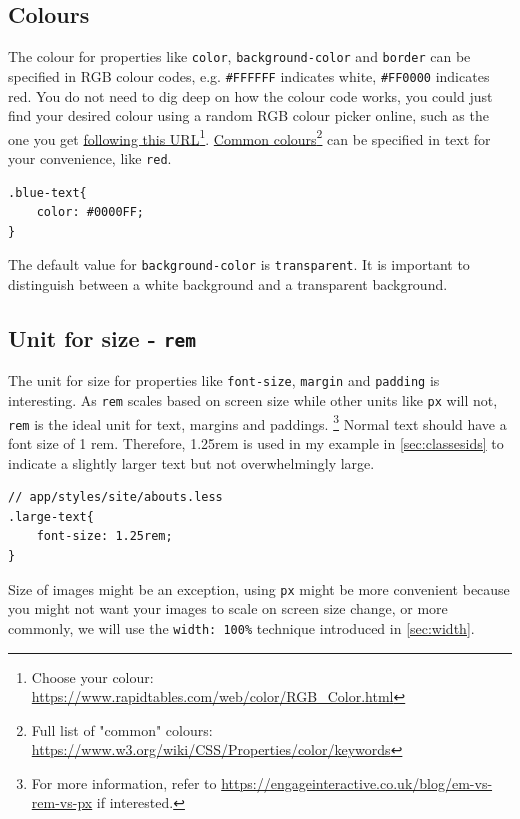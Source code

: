 \subsection{Colours}
\label{sec:colours}
The colour for properties like \texttt{color}, \texttt{background-color} and \texttt{border} can be specified in RGB colour codes, e.g. \texttt{\#FFFFFF} indicates white, \texttt{\#FF0000} indicates red. You do not need to dig deep on how the colour code works, you could just find your desired colour using a random RGB colour picker online, such as the one you get  \href{https://www.rapidtables.com/web/color/RGB_Color.html}{following this URL}\footnote{Choose your colour: \url{https://www.rapidtables.com/web/color/RGB_Color.html}}.   \href{https://www.w3.org/wiki/CSS/Properties/color/keywords}{Common colours}\footnote{Full list of "common" colours: \url{https://www.w3.org/wiki/CSS/Properties/color/keywords}} can be specified in text for your convenience, like \texttt{red}.

\begin{lstlisting}
.blue-text{
    color: #0000FF; 
}
\end{lstlisting}

The default value for \texttt{background-color} is \texttt{transparent}. It is important to distinguish between a white background and a transparent background. 

\subsection{Unit for size - \texttt{rem}}
\label{sec:rem}

The unit for size for properties like \texttt{font-size}, \texttt{margin} and \texttt{padding} is interesting. As \texttt{rem} scales based on screen size while other units like \texttt{px} will not, \texttt{rem} is the ideal unit for text, margins and paddings. \footnote{For more information, refer to \url{https://engageinteractive.co.uk/blog/em-vs-rem-vs-px} if interested.} Normal text should have a font size of 1 rem. Therefore, 1.25rem is used in my example in \cref{sec:classesids} to indicate a slightly larger text but not overwhelmingly large.

\begin{lstlisting}[language=pug]
// app/styles/site/abouts.less
.large-text{
    font-size: 1.25rem;
}
\end{lstlisting}

Size of images might be an exception, using \texttt{px} might be more convenient because you might not want your images to scale on screen size change, or more commonly, we will use the \texttt{width: 100\%} technique introduced in \cref{sec:width}.

